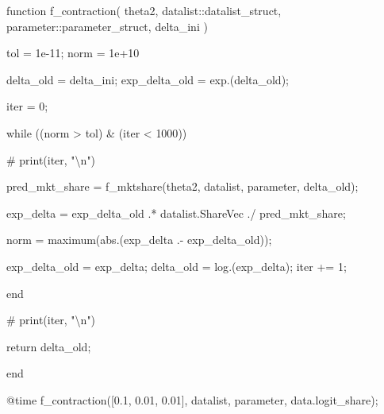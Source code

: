 \documentclass[
  letterpaper,
  DIV=11,
  numbers=noendperiod]{scrreprt}
\newenvironment{Shaded}{\begin{snugshade}}{\end{snugshade}}
\newcommand{\CommentTok}[1]{\textcolor[rgb]{0.37,0.37,0.37}{#1}}
\newcommand{\ControlFlowTok}[1]{\textcolor[rgb]{0.00,0.23,0.31}{#1}}
\newcommand{\DataTypeTok}[1]{\textcolor[rgb]{0.68,0.00,0.00}{#1}}
\newcommand{\FloatTok}[1]{\textcolor[rgb]{0.68,0.00,0.00}{#1}}
\newcommand{\FunctionTok}[1]{\textcolor[rgb]{0.28,0.35,0.67}{#1}}
\newcommand{\KeywordTok}[1]{\textcolor[rgb]{0.00,0.23,0.31}{#1}}
\newcommand{\NormalTok}[1]{\textcolor[rgb]{0.00,0.23,0.31}{#1}}
\newcommand{\OperatorTok}[1]{\textcolor[rgb]{0.37,0.37,0.37}{#1}}
\newcommand{\PreprocessorTok}[1]{\textcolor[rgb]{0.68,0.00,0.00}{#1}}
\begin{document}
\begin{Shaded}
\begin{Highlighting}[]
\KeywordTok{function} \FunctionTok{f\_contraction}\NormalTok{(}
\NormalTok{        theta2,}
\NormalTok{        datalist}\OperatorTok{::}\DataTypeTok{datalist\_struct}\NormalTok{,}
\NormalTok{        parameter}\OperatorTok{::}\DataTypeTok{parameter\_struct}\NormalTok{,}
\NormalTok{        delta\_ini}
\NormalTok{    )}
    
\NormalTok{    tol }\OperatorTok{=} \FloatTok{1e{-}11}\NormalTok{;}
\NormalTok{    norm }\OperatorTok{=} \FloatTok{1e+10}

\NormalTok{    delta\_old }\OperatorTok{=}\NormalTok{ delta\_ini;}
\NormalTok{    exp\_delta\_old }\OperatorTok{=} \FunctionTok{exp}\NormalTok{.(delta\_old);}
    
\NormalTok{    iter }\OperatorTok{=} \FloatTok{0}\NormalTok{;}
        
    \ControlFlowTok{while}\NormalTok{ ((norm }\OperatorTok{\textgreater{}}\NormalTok{ tol) }\OperatorTok{\&}\NormalTok{ (iter }\OperatorTok{\textless{}} \FloatTok{1000}\NormalTok{))}
        
\CommentTok{\#         print(iter, "\textbackslash{}n")}
        
\NormalTok{        pred\_mkt\_share }\OperatorTok{=} \FunctionTok{f\_mktshare}\NormalTok{(theta2, datalist, parameter, delta\_old);}
        
\NormalTok{        exp\_delta }\OperatorTok{=}\NormalTok{ exp\_delta\_old }\OperatorTok{.*}\NormalTok{ datalist.ShareVec }\OperatorTok{./}\NormalTok{ pred\_mkt\_share;}
        
\NormalTok{        norm }\OperatorTok{=} \FunctionTok{maximum}\NormalTok{(}\FunctionTok{abs}\NormalTok{.(exp\_delta }\OperatorTok{.{-}}\NormalTok{ exp\_delta\_old));}
        
\NormalTok{        exp\_delta\_old }\OperatorTok{=}\NormalTok{ exp\_delta;}
\NormalTok{        delta\_old }\OperatorTok{=} \FunctionTok{log}\NormalTok{.(exp\_delta);}
\NormalTok{        iter }\OperatorTok{+=} \FloatTok{1}\NormalTok{;}
        
    \ControlFlowTok{end}
    
\CommentTok{\#     print(iter, "\textbackslash{}n")}
    
    \ControlFlowTok{return}\NormalTok{ delta\_old;}
    
\KeywordTok{end}
    
\PreprocessorTok{@time} \FunctionTok{f\_contraction}\NormalTok{([}\FloatTok{0.1}\NormalTok{, }\FloatTok{0.01}\NormalTok{, }\FloatTok{0.01}\NormalTok{], datalist, parameter, data.logit\_share);}
\end{Highlighting}
\end{Shaded}
\end{document}
